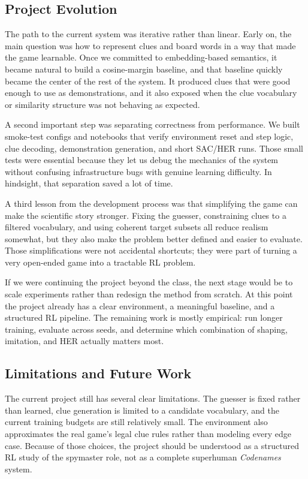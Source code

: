 \documentclass[9pt]{article}
\begin{document}
\subsection{Project Evolution}\label{development-path}

The path to the current system was iterative rather than linear. Early
on, the main question was how to represent clues and board words in a
way that made the game learnable. Once we committed to embedding-based
semantics, it became natural to build a cosine-margin baseline, and that
baseline quickly became the center of the rest of the system. It
produced clues that were good enough to use as demonstrations, and it
also exposed when the clue vocabulary or similarity structure was not
behaving as expected.

A second important step was separating correctness from performance. We
built smoke-test configs and notebooks that verify environment reset and
step logic, clue decoding, demonstration generation, and short SAC/HER
runs. Those small tests were essential because they let us debug the
mechanics of the system without confusing infrastructure bugs with
genuine learning difficulty. In hindsight, that separation saved a lot
of time.

A third lesson from the development process was that simplifying the
game can make the scientific story stronger. Fixing the guesser,
constraining clues to a filtered vocabulary, and using coherent target
subsets all reduce realism somewhat, but they also make the problem
better defined and easier to evaluate. Those simplifications were not
accidental shortcuts; they were part of turning a very open-ended game
into a tractable RL problem.

If we were continuing the project beyond the class, the next stage would
be to scale experiments rather than redesign the method from scratch. At
this point the project already has a clear environment, a meaningful
baseline, and a structured RL pipeline. The remaining work is mostly
empirical: run longer training, evaluate across seeds, and determine
which combination of shaping, imitation, and HER actually matters most.

\subsection{Limitations and Future
Work}\label{limitations-and-future-work}
The current project still has several clear limitations. The guesser is
fixed rather than learned, clue generation is limited to a candidate
vocabulary, and the current training budgets are still relatively small.
The environment also approximates the real game's legal clue rules
rather than modeling every edge case. Because of those choices, the
project should be understood as a structured RL study of the spymaster
role, not as a complete superhuman \emph{Codenames} system.
\end{document}
